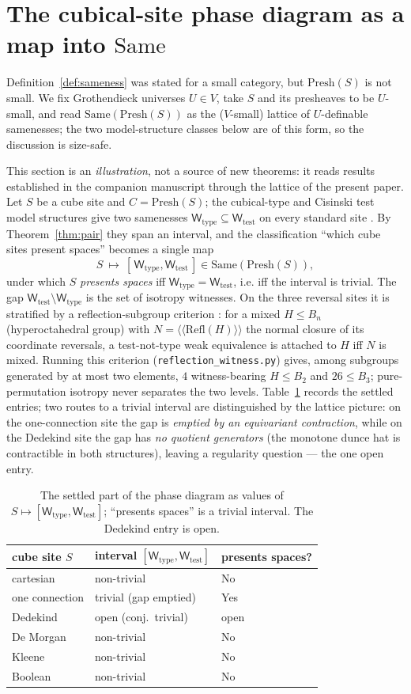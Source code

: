 \documentclass[11pt]{amsart}
\theoremstyle{definition}
\newcommand{\Same}{\mathrm{Same}}
\newcommand{\Wtest}{\mathsf{W}_{\mathrm{test}}}
\newcommand{\Wtype}{\mathsf{W}_{\mathrm{type}}}
\newcommand{\Presh}{\mathrm{Presh}}
\newcommand{\refl}{\mathrm{Refl}}
\newcommand{\Ncl}[1]{\langle\!\langle #1 \rangle\!\rangle}
\begin{document}
\section{The cubical-site phase diagram as a map into $\Same$}\label{sec:cube}

Definition~\ref{def:sameness} was stated for a small category, but $\Presh(S)$
is not small. We fix Grothendieck universes $U\in V$, take $S$ and its presheaves
to be $U$-small, and read $\Same(\Presh(S))$ as the ($V$-small) lattice of
$U$-definable samenesses; the two model-structure classes below are of this form,
so the discussion is size-safe.

This section is an \emph{illustration}, not a source of new theorems: it reads
results established in the companion manuscript \cite{CS25} through the lattice
of the present paper. Let $S$ be a cube site and $C=\Presh(S)$; the cubical-type
and Cisinski test model structures give two samenesses $\Wtype\subseteq\Wtest$
on every standard site \cite{CS25}. By Theorem~\ref{thm:pair} they span an
interval, and the classification ``which cube sites present spaces'' becomes a
single map
\[
S\ \longmapsto\ [\,\Wtype,\Wtest\,]\in\Same(\Presh(S)),
\]
under which $S$ \emph{presents spaces} iff $\Wtype=\Wtest$, i.e. iff the interval
is trivial.
The gap $\Wtest\setminus\Wtype$ is the set of isotropy witnesses. On the three
reversal sites it is stratified by a reflection-subgroup criterion \cite{CS25}:
for a mixed $H\le B_n$ (hyperoctahedral group) with $N=\Ncl{\refl(H)}$ the normal
closure of its coordinate reversals, a test-not-type weak equivalence is attached
to $H$ iff $N$ is mixed. Running this criterion (\texttt{reflection\_witness.py})
gives, among subgroups generated by at most two elements, $4$ witness-bearing
$H\le B_2$ and $26\le B_3$; pure-permutation isotropy never separates the two
levels. Table~\ref{tab:phase} records the settled entries; two routes to a
trivial interval are distinguished by the lattice picture: on the one-connection
site the gap is \emph{emptied by an equivariant contraction}, while on the
Dedekind site the gap has \emph{no quotient generators} (the monotone dunce hat
is contractible in both structures), leaving a regularity question --- the one
open entry.

\begin{table}[ht]
\centering
\begin{tabular}{@{}lll@{}}
\toprule
cube site $S$ & interval $[\Wtype,\Wtest]$ & presents spaces? \\
\midrule
cartesian & non-trivial & No \\
one connection & trivial (gap emptied) & Yes \\
Dedekind & open (conj.\ trivial) & open \\
De Morgan & non-trivial & No \\
Kleene & non-trivial & No \\
Boolean & non-trivial & No \\
\bottomrule
\end{tabular}
\caption{The settled part of the phase diagram as values of
$S\mapsto[\Wtype,\Wtest]$; ``presents spaces'' is a trivial interval. The
Dedekind entry is open.}
\label{tab:phase}
\end{table}
\end{document}
